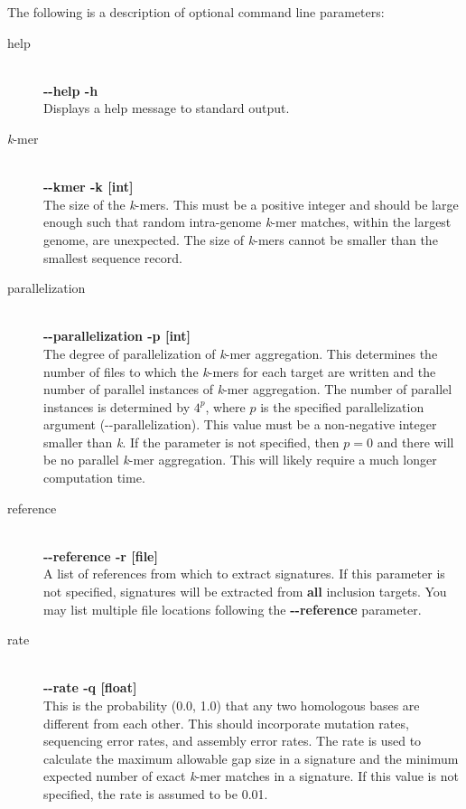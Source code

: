 \documentclass[a4paper,10pt]{article}
\begin{document}
The following is a description of optional command line parameters:

\begin{description}

  \item[help] \hfill \\
  \textbf{-{}-help -h} \hfill \\
  Displays a help message to standard output.
  
  \item[\textit{k}-mer] \hfill \\
  \textbf{-{}-kmer -k [int]} \hfill \\
  The size of the \textit{k}-mers. This must be a positive integer and should be large enough such that random intra-genome \textit{k}-mer matches, within the largest genome, are unexpected. The size of \textit{k}-mers cannot be smaller than the smallest sequence record.
  
  \item[parallelization] \hfill \\
  \textbf{-{}-parallelization -p [int]} \hfill \\
  The degree of parallelization of \textit{k}-mer aggregation. This determines the number of files to which the \textit{k}-mers for each target are written and the number of parallel instances of \textit{k}-mer aggregation. The number of parallel instances is determined by \(4^{p}\), where \(p\) is the specified parallelization argument (\mbox{-{}-parallelization}). This value must be a non-negative integer smaller than \textit{k}. If the parameter is not specified, then \(p = 0\) and there will be no parallel \textit{k}-mer aggregation. This will likely require a much longer computation time.
  
  \item[reference] \hfill \\
  \textbf{-{}-reference -r [file]} \hfill \\
  A list of references from which to extract signatures. If this parameter is not specified, signatures will be extracted from \textbf{all} inclusion targets. You may list multiple file locations following the \textbf{-{}-reference} parameter.
  
  \item[rate] \hfill \\
  \textbf{-{}-rate -q [float]} \hfill \\
  This is the probability (0.0, 1.0) that any two homologous bases are different from each other. This should incorporate mutation rates, sequencing error rates, and assembly error rates. The rate is used to calculate the maximum allowable gap size in a signature and the minimum expected number of exact \textit{k}-mer matches in a signature. If this value is not specified, the rate is assumed to be 0.01.
  

\end{description}
\end{document}
